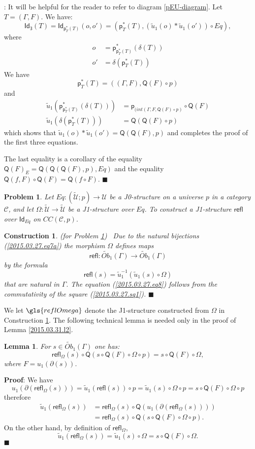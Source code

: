 \documentclass[12pt]{article}
\numberwithin{equation}{section}
\newenvironment{myproof}{{\bf Proof}:}{$\blacksquare$ \vskip 5mm }
\newtheorem{lemma}[proposition]{Lemma}
\newtheorem{problem}[proposition]{Problem}
\newtheorem{construction0}[proposition]{Construction}
\newenvironment{construction}[1]{\begin{construction0}(for Problem \ref{#1})\ }{$\blacksquare$ \end{construction0}}
\newcommand{\sr}{\rightarrow}
\newcommand{\wt}{\widetilde}
\newcommand{\toCC}{CC} %
\newcommand{\C}{{\mathcal C}}  %
\newcommand{\p}{\mathsf{p}}
\newcommand{\Id}{\mathsf{Id}} %
\newcommand{\Idx}{\mathsf{Id_3}} %
\newcommand{\refl}{\mathsf{refl}}
\newcommand{\U}{\mathcal{U}}
\newcommand{\Q}{\mathsf{Q}}
\newcommand{\Obwt}{\wt{Ob}}
\begin{document}
%
\begin{myproof}
It will be helpful for the reader to refer to diagram \ref{pEU-diagram}.
Let $T=(\Gamma,F)$. We have:
%
$$\Idx(T)=\Id_{\p_T^*(T)}(o,o')= (\p_T^*(T), (\wt{u}_1(o)*\wt{u}_1(o')) \circ Eq),$$
%
where
%
\begin{align*}
  o &=\p_{\p_T^*(T)}^*(\delta(T)) \\
  o'&=\delta(\p_T^*(T))
\end{align*}
%
We have
%
$$\p_T^*(T) =((\Gamma,F),\Q(F)\circ p)$$
%
and
%
\begin{align*}
  \wt{u}_1(\p_{\p_T^*(T)}^*(\delta(T)))&=\p_{(int(\Gamma,F, \Q(F)\circ p)}\circ \Q(F) \\
  \wt{u}_1(\delta(\p_T^*(T)))&=\Q(\Q(F)\circ p)
\end{align*}
%
which shows that $\wt{u}_1(o)*\wt{u}_1(o')=\Q(\Q(F),p)$ and completes the proof
of the first three equations.

The last equality is a corollary of the equality $\Q(F)_{E}=\Q(\Q(\Q(F),p),Eq)$
and the equality $\Q(f,F)\circ \Q(F)=\Q(f\circ F)$.
\end{myproof}
%
\begin{problem}
\label{2015.03.27.prob4} Let $Eq:(\wt{\U};p)\sr \U$
be a J0-structure on a universe $p$ in a category $\C$,
and let $\Omega:\wt{\U}\sr \wt{\U}$ be a J1-structure over $Eq$.
To construct a J1-structure $\refl$ over $\Id_{Eq}$ on $\toCC({\C},p)$.
\end{problem}
%
\begin{construction}{2015.03.27.prob4}\rm
\label{2015.03.27.constr4} Due to the natural bijections
(\ref{2015.03.27.eq7a}) the morphism $\Omega$ defines maps
%
$$\refl:\Obwt_1(\Gamma)\sr \Obwt_1(\Gamma)$$
%
by the formula
%
$$\refl(s)=\wt{u}_1^{-1}(\wt{u}_1(s)\circ \Omega)$$
%
that are natural in $\Gamma$. The equation (\ref{2015.03.27.eq8}) follows from
the commutativity of the square (\ref{2015.03.27.sq1}).
\end{construction}
%
We let $\gls{reflOmega}$ denote the J1-structure constructed from $\Omega$ in
Construction \ref{2015.03.27.constr4}.
%
The following technical lemma is needed only in the proof of Lemma
\ref{2015.03.31.l2}.
%
\begin{lemma}
\label{2015.04.02.l3} For $s\in \Obwt_1(\Gamma)$ one has:
%
$$\refl_{\Omega}(s)\circ \Q(s\circ \Q(F)\circ \Omega\circ p)=s\circ \Q(F)\circ
\Omega,$$
%
where $F=u_1(\partial(s))$.
\end{lemma}
%
\begin{myproof}
We have
%
$$u_1(\partial(\refl_{\Omega}(s)))=\wt{u}_1(\refl(s))\circ p=\wt{u}_1(s)\circ
\Omega\circ p=s\circ \Q(F)\circ \Omega\circ p$$
%
therefore
%
\begin{align*}
  \wt{u}_1(\refl_{\Omega}(s))
  & =\refl_{\Omega}(s)\circ \Q(u_1(\partial(\refl_{\Omega}(s)))) \\
  & = \refl_{\Omega}(s)\circ \Q(s\circ \Q(F)\circ \Omega\circ p).
\end{align*}
%
On the other hand, by definition of $\refl_{\Omega}$,
%
$$\wt{u}_1(\refl_{\Omega}(s))=\wt{u}_1(s)\circ \Omega=s\circ \Q(F)\circ \Omega.$$
%
\end{myproof}
\end{document}
